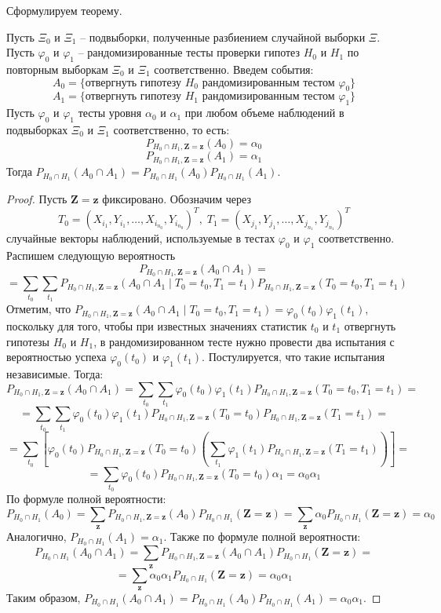 Сформулируем теорему.
\begin{theorem}\label{main_theorem}
    Пусть $\Xi_0$ и $\Xi_1$ -- подвыборки, полученные разбиением случайной выборки $\Xi$.
    Пусть $\varphi_0$ и $\varphi_1$ -- рандомизированные тесты 
    проверки гипотез $H_0$ и $H_1$ по повторным выборкам 
    $\Xi_0$ и $\Xi_1$ соответственно.
    Введем события:
    $$A_0 = \{\text{отвергнуть гипотезу $H_0$ рандомизированным тестом $\varphi_0$}\}$$ 
    $$A_1 = \{\text{отвергнуть гипотезу $H_1$ рандомизированным тестом $\varphi_1$}\}$$
    Пусть $\varphi_0$ и $\varphi_1$ тесты уровня $\alpha_0$ и $\alpha_1$
    при любом объеме наблюдений в подвыборках $\Xi_0$ и $\Xi_1$ соответственно, то есть:
    $$P_{H_0\cap H_1,\mathbf{Z=z}}(A_0)=\alpha_0$$ 
    $$P_{H_0\cap H_1,\mathbf{Z=z}}(A_1)=\alpha_1$$
    Тогда $P_{H_0\cap H_1}(A_0 \cap A_1)= P_{H_0\cap H_1}(A_0) P_{H_0\cap H_1}(A_1)$.
\end{theorem}
\begin{proof}
    Пусть $\mathbf{Z}=\mathbf{z}$ фиксировано. 
    Обозначим через
    $$T_0=(X_{i_1},Y_{i_1},\ldots,X_{i_{n_0}},Y_{i_{n_0}})^T, \;
    T_1=(X_{j_1},Y_{j_1},\ldots,X_{j_{n_1}},Y_{j_{n_1}})^T$$
    случайные векторы наблюдений, используемые в тестах $\varphi_0$ и 
    $\varphi_1$ соответственно.
    Распишем следующую вероятность
    $$
    P_{H_0\cap H_1,\mathbf{Z=z}}(A_0 \cap A_1)=
    $$
    $$
    =\sum_{t_0}\sum_{t_1} P_{H_0\cap H_1,\mathbf{Z=z}}(A_0 \cap A_1 \mid T_0=t_0, T_1=t_1)P_{H_0\cap H_1,\mathbf{Z=z}}(T_0=t_0, T_1=t_1)
    $$
    Отметим, что $P_{H_0\cap H_1,\mathbf{Z=z}}(A_0 \cap A_1 \mid T_0=t_0, T_1=t_1)=\varphi_0(t_0)\varphi_1(t_1)$, поскольку
    для того, чтобы при известных значениях статистик $t_0$ и $t_1$ отвергнуть гипотезы $H_0$ и $H_1$, в рандомизированном тесте нужно провести два испытания с вероятностью успеха
    $\varphi_0(t_0)$ и $\varphi_1(t_1)$. Постулируется, что такие испытания независимые. Тогда:
    $$
    P_{H_0\cap H_1,\mathbf{Z=z}}(A_0 \cap A_1)=\sum_{t_0}\sum_{t_1} \varphi_0(t_0) \varphi_1(t_1) P_{H_0\cap H_1,\mathbf{Z=z}}(T_0=t_0, T_1=t_1)=
    $$
    $$
    =\sum_{t_0}\sum_{t_1} \varphi_0(t_0) \varphi_1(t_1) P_{H_0\cap H_1,\mathbf{Z=z}}(T_0=t_0)P_{H_0\cap H_1,\mathbf{Z=z}}(T_1=t_1)=
    $$
    $$
    =\sum_{t_0}\left[ \varphi_0(t_0) P_{H_0\cap H_1,\mathbf{Z=z}}(T_0=t_0) \left(\sum_{t_1}\varphi_1(t_1) P_{H_0\cap H_1,\mathbf{Z=z}}(T_1=t_1)\right)\right]=
    $$
    $$
    = \sum_{t_0} \varphi_0(t_0) P_{H_0\cap H_1,\mathbf{Z=z}}(T_0=t_0) \alpha_1 
    =\alpha_0 \alpha_1
    $$
    По формуле полной вероятности:
    $$
    P_{H_0\cap H_1}(A_0) = \sum_{\mathbf{z}} P_{H_0\cap H_1,\mathbf{Z=z}}(A_0) P_{H_0\cap H_1}(\mathbf{Z}=\mathbf{z})
    = \sum_{\mathbf{z}} \alpha_0 P_{H_0\cap H_1}(\mathbf{Z}=\mathbf{z})=\alpha_0
    $$
    Аналогично, $P_{H_0\cap H_1}(A_1)=\alpha_1$. Также по формуле полной вероятности:
    $$
    P_{H_0\cap H_1}(A_0 \cap A_1) = \sum_{\mathbf{z}} P_{H_0\cap H_1,\mathbf{Z=z}}(A_0 \cap A_1) P_{H_0\cap H_1}(\mathbf{Z}=\mathbf{z})=
    $$
    $$
    = \sum_{\mathbf{z}} \alpha_0 \alpha_1 P_{H_0\cap H_1}(\mathbf{Z}=\mathbf{z})
    = \alpha_0 \alpha_1
    $$
    Таким образом, $P_{H_0\cap H_1}(A_0 \cap A_1)=P_{H_0\cap H_1}(A_0) P_{H_0\cap H_1}(A_1)=\alpha_0 \alpha_1$.
\end{proof}
